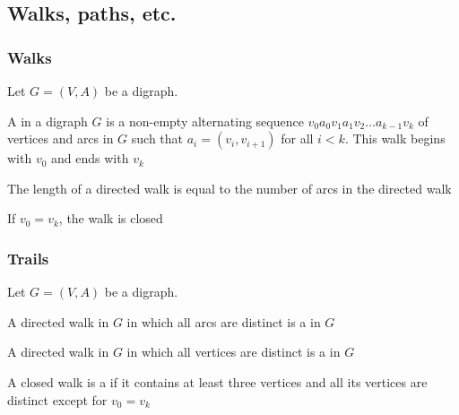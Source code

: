 \documentclass[aspectratio=43]{beamer}
\begin{document}
\subsection{Walks, paths, etc.}
\begin{frame}\frametitle{Walks}
	Let $G=(V,A)$ be a digraph.
	\begin{definition}
	A  in a digraph $G$ is a non-empty alternating sequence $v_0 a_0 v_1 a_1 v_2 \dots a_{k-1} v_k$ of vertices and arcs in $G$ such that $a_i=(v_i, v_{i+1})$ for all $i<k$. 
	This walk begins with $v_0$ and ends with $v_k$
	\end{definition}
	\begin{definition}
	The length of a directed walk is equal to the number of arcs in the directed walk
	\end{definition}
	\begin{definition}
	If $v_0=v_k$, the walk is closed
	\end{definition}
\end{frame}


\begin{frame}\frametitle{Trails}
	Let $G=(V,A)$ be a digraph.
	\begin{definition}
	A directed walk in $G$ in which all arcs are distinct is a  in $G$
	\end{definition}
	\begin{definition}
	A directed walk in $G$ in which all vertices are distinct is a  in $G$
	\end{definition}
	\begin{definition}
	A closed walk is a  if it contains at least three vertices and all its vertices are distinct except for $v_0=v_k$
	\end{definition}
\end{frame}
\end{document}
